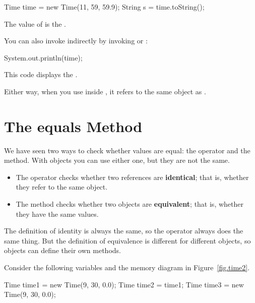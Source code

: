 \begin{code}
Time time = new Time(11, 59, 59.9);
String s = time.toString();
\end{code}

The value of  is the  .

You can also invoke  indirectly by invoking  or :

\begin{code}
System.out.println(time);
\end{code}

This code displays the  . 

Either way, when you use  inside , it refers to the same object as .


\section{The equals Method}
\label{equals}


We have seen two ways to check whether values are equal: the \java{==} operator and the  method.
With objects you can use either one, but they are not the same.

\begin{itemize}


\item The \java{==} operator checks whether two references are {\bf identical}; that is, whether they refer to the same object.


\item The  method checks whether two objects are {\bf equivalent}; that is, whether they have the same values.

\end{itemize}

The definition of identity is always the same, so the \java{==} operator always does the same thing.
But the definition of equivalence is different for different objects, so objects can define their own  methods.

Consider the following variables and the memory diagram in Figure~\ref{fig.time2}.

\begin{code}
Time time1 = new Time(9, 30, 0.0);
Time time2 = time1;
Time time3 = new Time(9, 30, 0.0);
\end{code}

